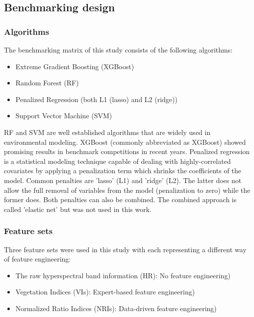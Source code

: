 \documentclass[letterpaper, peerreview, draftcls]{IEEEtran}
\begin{document}
\subsection{Benchmarking design}

\subsubsection{Algorithms}

\noindent The benchmarking matrix of this study consists of the following algorithms:

\begin{itemize}
	\item  Extreme Gradient Boosting (XGBoost)
	\item  Random Forest (RF)
	\item  Penalized Regression (both L1 (lasso) and L2 (ridge))
	\item  Support Vector Machine (SVM)
\end{itemize}

\noindent \ac{RF} and {SVM} are well established algorithms that are widely used in environmental modeling.
\ac{XGBoost} (commonly abbreviated as XGBoost) showed promising results in benchmark competitions in recent years.
Penalized regression is a statistical modeling technique capable of dealing with highly-correlated covariates by applying a penalization term which shrinks the coefficients of the model\cite{hastie2001}.
Common penalties are 'lasso' (L1) and 'ridge' (L2).
The latter does not allow the full removal of variables from the model (penalization to zero) while the former does.
Both penalties can also be combined.
The combined approach is called 'elastic net' but was not used in this work.

\subsubsection{Feature sets}

\noindent Three feature sets were used in this study with each representing a different way of feature engineering:

\begin{itemize}
	\item The raw hyperspectral band information (HR): No feature engineering) %
	\item Vegetation Indices (\ac{VIs}): Expert-based feature engineering)
	\item Normalized Ratio Indices (\ac{NRIs}): Data-driven feature engineering)
\end{itemize}
\end{document}
